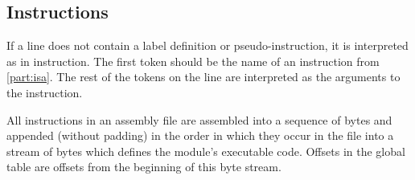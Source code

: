 \subsection{Instructions}
If a line does not contain a label definition or pseudo-instruction, it is interpreted as in instruction. The first token should be the name of an instruction from \autoref{part:isa}. The rest of the tokens on the line are interpreted as the arguments to the instruction.

All instructions in an assembly file are assembled into a sequence of bytes and appended (without padding) in the order in which they occur in the file into a stream of bytes which defines the module's executable code. Offsets in the global table are offsets from the beginning of this byte stream.
